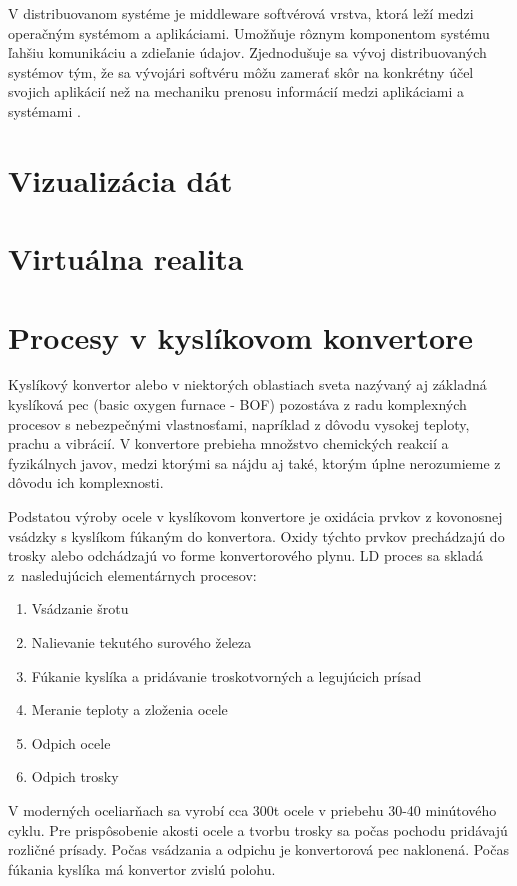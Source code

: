 \documentclass[]{tukediphc}
\begin{document}
V distribuovanom systéme je middleware softvérová vrstva, ktorá leží medzi operačným systémom a aplikáciami. Umožňuje rôznym komponentom systému ľahšiu komunikáciu a zdieľanie údajov. Zjednodušuje sa vývoj distribuovaných systémov tým, že sa vývojári softvéru môžu zamerať skôr na konkrétny účel svojich aplikácií než na mechaniku prenosu informácií medzi aplikáciami a systémami \citep{ddsfoundation}.

\section{Vizualizácia dát}


\section{Virtuálna realita}





\section{Procesy v kyslíkovom konvertore}

Kyslíkový konvertor alebo v niektorých oblastiach sveta nazývaný aj základná kyslíková pec (basic oxygen furnace - BOF) pozostáva z radu komplexných procesov s nebezpečnými vlastnosťami, napríklad z dôvodu vysokej teploty, prachu a vibrácií. V konvertore prebieha  množstvo chemických reakcií a fyzikálnych javov, medzi ktorými sa nájdu aj také, ktorým úplne nerozumieme z dôvodu ich komplexnosti.

Podstatou výroby ocele v kyslíkovom konvertore je oxidácia prvkov z kovonosnej vsádzky s kyslíkom fúkaným do konvertora. Oxidy týchto prvkov prechádzajú do trosky alebo odchádzajú vo forme konvertorového plynu. LD proces sa skladá z~nasledujúcich elementárnych procesov:

\begin{enumerate}
	\item Vsádzanie šrotu
	\item Nalievanie tekutého surového železa
	\item Fúkanie kyslíka a pridávanie troskotvorných a legujúcich prísad
	\item Meranie teploty a zloženia ocele
	\item Odpich ocele
	\item Odpich trosky
\end{enumerate}

V moderných oceliarňach sa vyrobí cca 300t ocele v priebehu 30-40 minútového cyklu. Pre prispôsobenie akosti ocele a tvorbu trosky sa počas pochodu pridávajú rozličné prísady. Počas vsádzania a odpichu je konvertorová pec naklonená. Počas fúkania kyslíka má konvertor zvislú polohu.
\end{document}
